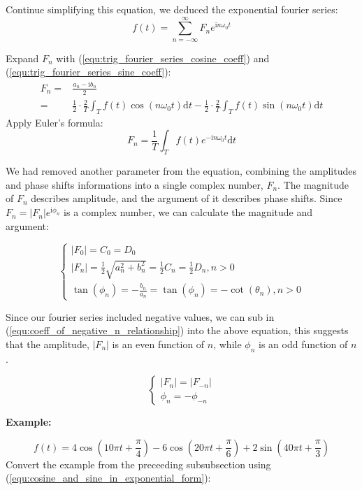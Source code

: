 \documentclass[12pt]{article}
\begin{document}
Continue simplifying this equation, we deduced the exponential fourier series:
\begin{equation}
    f(t) = \sum_{n=-\infty}^{\infty}F_ne^{\mathrm{i}n\omega_0t}
\end{equation}

Expand $F_n$ with (\ref{equ:trig_fourier_series_cosine_coeff}) and (\ref{equ:trig_fourier_series_sine_coeff}):
$$\begin{aligned} 
    F_n 
    =& \frac{a_n-\mathrm{i}b_n}{2}    \\
    =& \frac{1}{2}\cdot\frac{2}{T} \int_{T} f(t)\cos(n\omega_0t) \mathrm{d}t   
        - \frac{\mathrm{i}}{2}\cdot\frac{2}{T} \int_{T} f(t)\sin(n\omega_0t) \mathrm{d}t
\end{aligned}$$
\indent Apply Euler's formula:
\begin{equation}
    F_n = \frac{1}{T}\int_{T} f(t)e^{-\mathrm{i}n\omega_0t} \mathrm{d}t
    \label{equ:fourier_series_exponent_coeff}
\end{equation}

\indent We had removed another parameter from the equation, combining the amplitudes and phase shifts informations 
into a single complex number, $F_n$. The magnitude of $F_n$ describes amplitude, 
and the argument of it describes phase shifts.
Since $F_n = \left|F_n\right|e^{\mathrm{i}\phi_n}$ is a complex number, 
we can calculate the magnitude and argument:

$$\begin{cases}
    \left|F_0\right| = C_0 = D_0  \\
    \left|F_n\right| = \frac{1}{2}\sqrt{a_n^2+b_n^2} = \frac{1}{2}C_n = \frac{1}{2}D_n , n > 0   \\
    \tan(\phi_n) = -\frac{b_n}{a_n} = \tan(\phi_n) = -\cot(\theta_n) , n > 0
\end{cases}$$

\indent Since our fourier series included negative values, we can sub in ({\ref{equ:coeff_of_negative_n_relationship}}) 
into the above equation, this suggests that the amplitude, $\left|F_n\right|$ is an even function of $n$, 
while $\phi_n$ is an odd function of $n$. 

$$\begin{cases}
    \left|F_n\right| = \left|F_{-n}\right| \\
    \phi_n = -\phi_{-n}
\end{cases}$$


\noindent\textbf{Example:}

$$f(t) = 4\cos(10\pi t+\frac{\pi}{4}) - 6\cos(20\pi t+\frac{\pi}{6}) + 2\sin(40\pi t+\frac{\pi}{3})$$
\indent Convert the example from the preceeding subsubsection using ({\ref{equ:cosine_and_sine_in_exponential_form}}):
\end{document}
